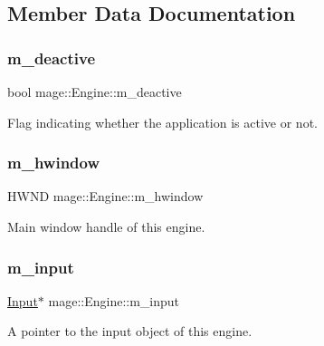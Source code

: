 \subsection{Member Data Documentation}
\hypertarget{classmage_1_1_engine_ab8a4b0157403708ae7d1d018a95b4c63}{}\label{classmage_1_1_engine_ab8a4b0157403708ae7d1d018a95b4c63} 
\subsubsection{\texorpdfstring{m\+\_\+deactive}{m\_deactive}}
{\footnotesize\ttfamily bool mage\+::\+Engine\+::m\+\_\+deactive\hspace{0.3cm}{\ttfamily [protected]}}

Flag indicating whether the application is active or not. \hypertarget{classmage_1_1_engine_a1dda09f0ed656180f926616a0d3f95f1}{}\label{classmage_1_1_engine_a1dda09f0ed656180f926616a0d3f95f1} 
\subsubsection{\texorpdfstring{m\+\_\+hwindow}{m\_hwindow}}
{\footnotesize\ttfamily H\+W\+ND mage\+::\+Engine\+::m\+\_\+hwindow\hspace{0.3cm}{\ttfamily [protected]}}

Main window handle of this engine. \hypertarget{classmage_1_1_engine_a432ac639c593fd0fb8cede2463fe10c2}{}\label{classmage_1_1_engine_a432ac639c593fd0fb8cede2463fe10c2} 
\subsubsection{\texorpdfstring{m\+\_\+input}{m\_input}}
{\footnotesize\ttfamily \hyperlink{classmage_1_1_input}{Input}$\ast$ mage\+::\+Engine\+::m\+\_\+input\hspace{0.3cm}{\ttfamily [protected]}}

A pointer to the input object of this engine. \hypertarget{classmage_1_1_engine_ad2107f910b4471ee3d3934588c6d36c3}{}\label{classmage_1_1_engine_ad2107f910b4471ee3d3934588c6d36c3} 
